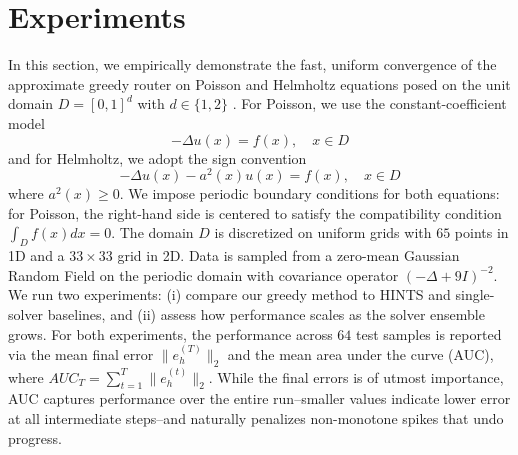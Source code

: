 \documentclass{article} %
\newcommand\ambuj[1]{\textcolor{red}{AT: #1}}
\begin{document}
\section{Experiments}\label{sec:experiments}

In this section, we empirically demonstrate the fast, uniform convergence of the approximate greedy router on Poisson and Helmholtz equations posed on the unit domain $D = [0, 1]^d$ with $d\in \{1, 2\}$ .
For Poisson, we use the constant-coefficient model
$$- \Delta u(x) = f(x), \quad x\in D$$ and for Helmholtz, we adopt the sign convention 
$$-\Delta u(x) - a^2(x)u(x) = f(x), \quad x\in D$$ where $a^2(x) \geq 0$. We impose periodic boundary conditions for both equations: for Poisson, the right-hand side is centered to satisfy the compatibility condition $\int_D f(x)dx = 0$. The domain $D$ is discretized on uniform grids with $65$ points in 1D and a $33 \times 33$ grid in 2D. 
Data is sampled from a zero-mean Gaussian Random Field on the periodic domain with covariance operator $(- \Delta + 9I)^{-2}$. We run two experiments: (i) compare our greedy method to HINTS and single-solver baselines, and (ii) assess how performance scales as the solver ensemble grows. For both experiments, the performance across $64$ test samples is reported via the mean final error $\|e^{(T)}_h\|_2$ and the mean area under the curve (AUC), where $AUC_T = \sum_{t = 1}^T\|e^{(t)}_h\|_2$. While the final errors is of utmost importance, AUC captures performance over the entire run--smaller values indicate lower error at all intermediate steps--and naturally penalizes non-monotone spikes that undo progress. 
\end{document}
